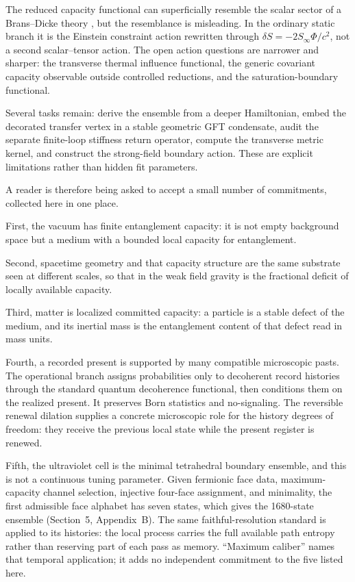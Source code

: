 \documentclass[11pt]{article}
\begin{document}
The reduced capacity functional can superficially resemble the scalar sector of a Brans--Dicke theory \citep{BransDicke1961}, but the resemblance is misleading. In the ordinary static branch it is the Einstein constraint action rewritten through $\delta S=-2S_\infty\Phi/c^2$, not a second scalar--tensor action. The open action questions are narrower and sharper: the transverse thermal influence functional, the generic covariant capacity observable outside controlled reductions, and the saturation-boundary functional.

Several tasks remain: derive the ensemble from a deeper Hamiltonian, embed the decorated transfer vertex in a stable geometric GFT condensate, audit the separate finite-loop stiffness return operator, compute the transverse metric kernel, and construct the strong-field boundary action. These are explicit limitations rather than hidden fit parameters.

A reader is therefore being asked to accept a small number of commitments, collected here in one place.

First, the vacuum has finite entanglement capacity: it is not empty background space but a medium with a bounded local capacity for entanglement.

Second, spacetime geometry and that capacity structure are the same substrate seen at different scales, so that in the weak field gravity is the fractional deficit of locally available capacity.

Third, matter is localized committed capacity: a particle is a stable defect of the medium, and its inertial mass is the entanglement content of that defect read in mass units.

Fourth, a recorded present is supported by many compatible microscopic pasts. The operational branch assigns probabilities only to decoherent record histories through the standard quantum decoherence functional, then conditions them on the realized present. It preserves Born statistics and no-signaling. The reversible renewal dilation supplies a concrete microscopic role for the history degrees of freedom: they receive the previous local state while the present register is renewed.

Fifth, the ultraviolet cell is the minimal tetrahedral boundary ensemble, and this is not a continuous tuning parameter. Given fermionic face data, maximum-capacity channel selection, injective four-face assignment, and minimality, the first admissible face alphabet has seven states, which gives the 1680-state ensemble (Section~5, Appendix~B). The same faithful-resolution standard is applied to its histories: the local process carries the full available path entropy rather than reserving part of each pass as memory. ``Maximum caliber'' names that temporal application; it adds no independent commitment to the five listed here.
\end{document}

